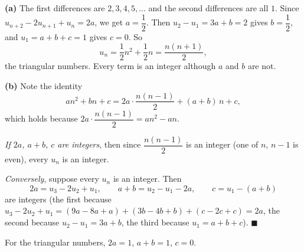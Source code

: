 \textbf{(a)} The first differences are $2,3,4,5,\dots$ and the second differences are all $1$. Since $u_{n+2}-2u_{n+1}+u_n=2a$, we get $a=\dfrac{1}{2}$. Then $u_2-u_1=3a+b=2$ gives $b=\dfrac{1}{2}$, and $u_1=a+b+c=1$ gives $c=0$. So
\[
u_n=\dfrac{1}{2}n^2+\dfrac{1}{2}n=\dfrac{n(n+1)}{2},
\]
the triangular numbers. Every term is an integer although $a$ and $b$ are not.

\textbf{(b)} Note the identity
\[
an^2+bn+c=2a\cdot\dfrac{n(n-1)}{2}+(a+b)\,n+c ,
\]
which holds because $2a\cdot\dfrac{n(n-1)}{2}=an^2-an$.

\emph{If $2a$, $a+b$, $c$ are integers}, then since $\dfrac{n(n-1)}{2}$ is an integer (one of $n$, $n-1$ is even), every $u_n$ is an integer.

\emph{Conversely}, suppose every $u_n$ is an integer. Then
\[
2a=u_3-2u_2+u_1,\qquad a+b=u_2-u_1-2a,\qquad c=u_1-(a+b)
\]
are integers (the first because $u_3-2u_2+u_1=(9a-8a+a)+(3b-4b+b)+(c-2c+c)=2a$, the second because $u_2-u_1=3a+b$, the third because $u_1=a+b+c$). $\blacksquare$

For the triangular numbers, $2a=1$, $a+b=1$, $c=0$.
